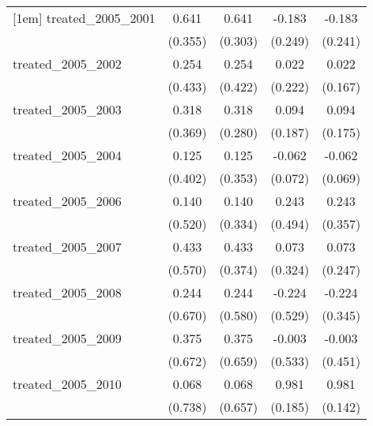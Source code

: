 {\begin{tabular}{l*{4}{c}}
[1em]
treated\_2005\_2001&       0.641         &       0.641\sym{*}  &      -0.183         &      -0.183         \\
            &     (0.355)         &     (0.303)         &     (0.249)         &     (0.241)         \\
[1em]
treated\_2005\_2002&       0.254         &       0.254         &       0.022         &       0.022         \\
            &     (0.433)         &     (0.422)         &     (0.222)         &     (0.167)         \\
[1em]
treated\_2005\_2003&       0.318         &       0.318         &       0.094         &       0.094         \\
            &     (0.369)         &     (0.280)         &     (0.187)         &     (0.175)         \\
[1em]
treated\_2005\_2004&       0.125         &       0.125         &      -0.062         &      -0.062         \\
            &     (0.402)         &     (0.353)         &     (0.072)         &     (0.069)         \\
[1em]
treated\_2005\_2006&       0.140         &       0.140         &       0.243         &       0.243         \\
            &     (0.520)         &     (0.334)         &     (0.494)         &     (0.357)         \\
[1em]
treated\_2005\_2007&       0.433         &       0.433         &       0.073         &       0.073         \\
            &     (0.570)         &     (0.374)         &     (0.324)         &     (0.247)         \\
[1em]
treated\_2005\_2008&       0.244         &       0.244         &      -0.224         &      -0.224         \\
            &     (0.670)         &     (0.580)         &     (0.529)         &     (0.345)         \\
[1em]
treated\_2005\_2009&       0.375         &       0.375         &      -0.003         &      -0.003         \\
            &     (0.672)         &     (0.659)         &     (0.533)         &     (0.451)         \\
[1em]
treated\_2005\_2010&       0.068         &       0.068         &       0.981\sym{***}&       0.981\sym{***}\\
            &     (0.738)         &     (0.657)         &     (0.185)         &     (0.142)         \\

\end{tabular}}
